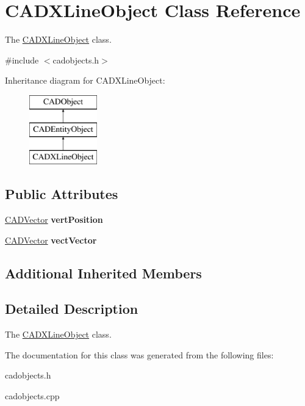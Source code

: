 \hypertarget{class_c_a_d_x_line_object}{}\section{C\+A\+D\+X\+Line\+Object Class Reference}
\label{class_c_a_d_x_line_object}


The \hyperlink{class_c_a_d_x_line_object}{C\+A\+D\+X\+Line\+Object} class.  




{\ttfamily \#include $<$cadobjects.\+h$>$}

Inheritance diagram for C\+A\+D\+X\+Line\+Object\+:\begin{figure}[H]
\begin{center}
\leavevmode
\includegraphics[height=3.000000cm]{class_c_a_d_x_line_object}
\end{center}
\end{figure}
\subsection*{Public Attributes}
\begin{DoxyCompactItemize}
\item 
\hyperlink{class_c_a_d_vector}{C\+A\+D\+Vector} {\bfseries vert\+Position}\hypertarget{class_c_a_d_x_line_object_ac084e6208978122226427ba3355e0573}{}\label{class_c_a_d_x_line_object_ac084e6208978122226427ba3355e0573}

\item 
\hyperlink{class_c_a_d_vector}{C\+A\+D\+Vector} {\bfseries vect\+Vector}\hypertarget{class_c_a_d_x_line_object_a4a2071534c2fb17213bfb091e28981a2}{}\label{class_c_a_d_x_line_object_a4a2071534c2fb17213bfb091e28981a2}

\end{DoxyCompactItemize}
\subsection*{Additional Inherited Members}


\subsection{Detailed Description}
The \hyperlink{class_c_a_d_x_line_object}{C\+A\+D\+X\+Line\+Object} class. 

The documentation for this class was generated from the following files\+:\begin{DoxyCompactItemize}
\item 
cadobjects.\+h\item 
cadobjects.\+cpp\end{DoxyCompactItemize}
